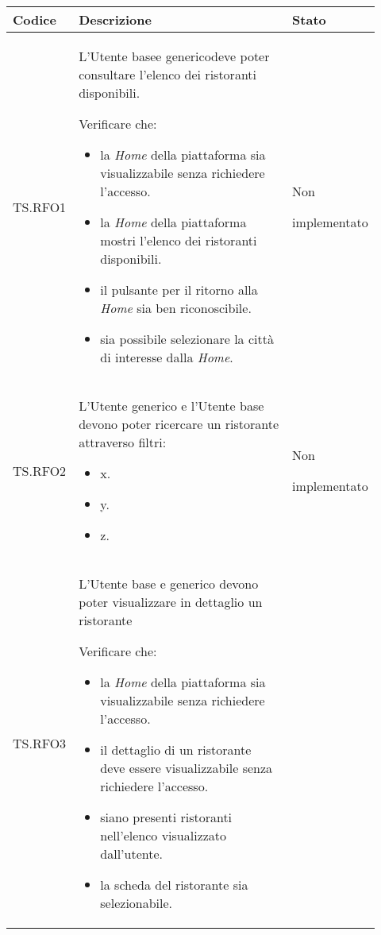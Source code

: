 \fontsize{10}{12}\selectfont
\begin{longtable}{|p{0.10\linewidth}|p{0.70\linewidth}|p{0.12\linewidth}|}
    \hline
	\textbf{Codice} & \textbf{Descrizione} & \textbf{Stato} \\
    \hline
    TS.RFO1 & 
    L'Utente base\g e generico\g deve poter consultare l'elenco dei ristoranti disponibili. \par 
    Verificare che: 
    \begin{itemize}
        \item la \textit{Home} della piattaforma sia visualizzabile senza richiedere l'accesso.
        \item la \textit{Home} della piattaforma mostri l'elenco dei ristoranti disponibili.
        \item il pulsante per il ritorno alla \textit{Home} sia ben riconoscibile.
        \item sia possibile selezionare la città di interesse dalla \textit{Home}.
    \end{itemize}&
    Non \par implementato \\
    \hline
    TS.RFO2 & 
    L’Utente generico e l’Utente base devono poter ricercare un ristorante attraverso filtri: %
    \begin{itemize}
        \item x.
        \item y.
        \item z.
    \end{itemize}&
    Non \par implementato  \\
    \hline
    TS.RFO3 & 
    L'Utente base e generico devono poter visualizzare in dettaglio un ristorante \par 
    Verificare che: 
    \begin{itemize}
        \item la \textit{Home} della piattaforma sia visualizzabile senza richiedere l'accesso.
        \item il dettaglio di un ristorante deve essere visualizzabile senza richiedere l'accesso.
        \item siano presenti ristoranti nell'elenco visualizzato dall'utente.
        \item la scheda del ristorante sia selezionabile.
    \end{itemize}&

\end{longtable}

